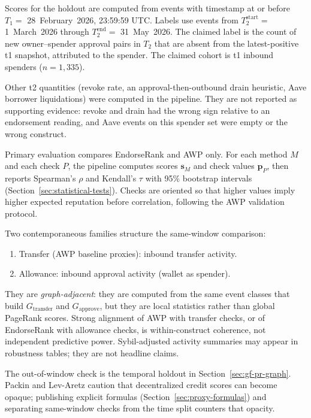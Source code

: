 
Scores for the holdout are computed from events with timestamp at or before $T_1=$ 28~February~2026, 23:59:59 UTC. Labels use events from $T_2^{\mathrm{start}}=$ 1~March~2026 through $T_2^{\mathrm{end}}=$ 31~May~2026. The claimed label is the count of new owner--spender approval pairs in $T_2$ that are absent from the latest-positive t1 snapshot, attributed to the spender. The claimed cohort is t1 inbound spenders ($n=1{,}335$).

Other t2 quantities (revoke rate, an approval-then-outbound drain heuristic, Aave borrower liquidations) were computed in the pipeline. They are not reported as supporting evidence: revoke and drain had the wrong sign relative to an endorsement reading, and Aave events on this spender set were empty or the wrong construct.


Primary evaluation compares EndorseRank and AWP only. For each method $M$ and each check $P$, the pipeline computes scores $\mathbf{s}_M$ and check values $\mathbf{p}_P$, then reports Spearman's $\rho$ and Kendall's $\tau$ with 95\% bootstrap intervals (Section~\ref{sec:statistical-tests}). Checks are oriented so that higher values imply higher expected reputation before correlation, following the AWP validation protocol.

Two contemporaneous families structure the same-window comparison:
\begin{enumerate}
\item Transfer (AWP baseline proxies): inbound transfer activity.
\item Allowance: inbound approval activity (wallet as spender).
\end{enumerate}
They are \emph{graph-adjacent}: they are computed from the same event classes that build $G_{\mathrm{transfer}}$ and $G_{\mathrm{approve}}$, but they are local statistics rather than global PageRank scores. Strong alignment of AWP with transfer checks, or of EndorseRank with allowance checks, is within-construct coherence, not independent predictive power. Sybil-adjusted activity summaries may appear in robustness tables; they are not headline claims.

The out-of-window check is the temporal holdout in Section~\ref{sec:gf-pr-graph}. Packin and Lev-Aretz caution that decentralized credit scores can become opaque; publishing explicit formulas (Section~\ref{sec:proxy-formulas}) and separating same-window checks from the time split counters that opacity.

